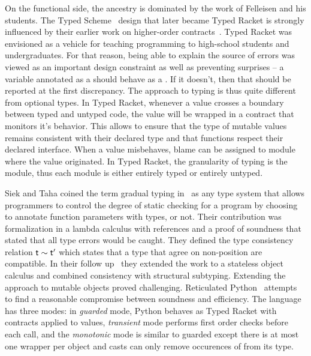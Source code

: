 \documentclass[a4paper,USenglish]{tex/lipics-v2016}
\begin{document}
On the functional side, the ancestry is dominated by the work of Felleisen
and his students.  The Typed Scheme~\cite{tf-popl08} design that later
became Typed Racket is strongly influenced by their earlier work on
higher-order contracts~\cite{ff-icfp02}. Typed Racket was envisioned as a
vehicle for teaching programming to high-school students and undergraduates.
For that reason, being able to explain the source of errors was viewed as an
important design constraint as well as preventing surprises -- a variable
annotated as a \C should behave as a \C. If it doesn't, then that should be
reported at the first discrepancy. The approach to typing is thus quite
different from optional types. In Typed Racket, whenever a value crosses a
boundary between typed and untyped code, the value will be wrapped in a
contract that monitors it's behavior. This allows to ensure that the type of
mutable values remains consistent with their declared type and that
functions respect their declared interface. When a value misbehaves, blame
can be assigned to module where the value originated. In Typed Racket, the
granularity of typing is the module, thus each module is either entirely
typed or entirely untyped.

Siek and Taha coined the term gradual typing in~\cite{SiekTaha06} as any
type system that allows programmers to control the degree of static checking
for a program by choosing to annotate function parameters with types, or
not. Their contribution was formalization in a lambda calculus with
references and a proof of soundness that stated that all type errors would
be caught. They defined the type consistency relation $\t \sim \tp$ which
states that a type that agree on non-\any position are compatible.  In their
follow up~\cite{SiekTaha07} they extended the work to a stateless object
calculus and combined consistency with structural subtyping. Extending the
approach to mutable objects proved challenging. Reticulated
Python~\cite{siek14} attempts to find a reasonable compromise between
soundness and efficiency.  The language has three modes: in \emph{guarded}
mode, Python behaves as Typed Racket with contracts applied to values,
\emph{transient} mode performs first order checks before each call, and the
\emph{monotonic} mode is similar to guarded except there is at most one
wrapper per object and casts can only remove occurences of \any from its
type.
\end{document}
